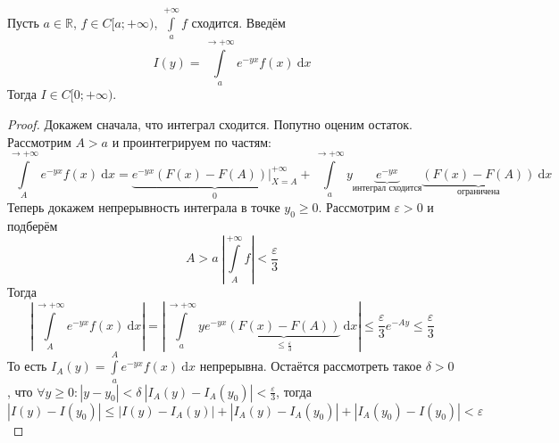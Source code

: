 \documentclass{article}
\let\eps\varepsilon
\begin{document}
    \begin{lemma}
        Пусть $a\in\mathbb R$, $f\in C[a;+\infty)$, $\int\limits_a^{+\infty}f$ сходится. Введём
        $$
        I(y)=\int\limits_a^{\to+\infty}e^{-yx}f(x)~\mathrm dx
        $$
        Тогда $I\in C[0;+\infty)$.
    \end{lemma}
    \begin{proof}
        Докажем сначала, что интеграл сходится. Попутно оценим остаток. Рассмотрим $A>a$ и проинтегрируем по частям:
        $$
        \int\limits_A^{\to+\infty}e^{-yx}f(x)~\mathrm dx=\underbrace{e^{-yx}(F(x)-F(A))\bigg|_{X=A}^{+\infty}}_0+\int\limits_a^{\to+\infty}y\underbrace{e^{-yx}}_{\text{интеграл сходится}}\underbrace{(F(x)-F(A))}_{\text{ограничена}}~\mathrm dx
        $$
        Теперь докажем непрерывность интеграла в точке $y_0\geqslant0$. Рассмотрим $\eps>0$ и подберём
        $$
        A>a~\left|\int\limits_A^{+\infty}f\right|<\frac\eps3
        $$
        Тогда
        $$
        \left|\int\limits_A^{\to+\infty}e^{-yx}f(x)~\mathrm dx\right|=\left|\int\limits_a^{\to+\infty}ye^{-yx}\underbrace{(F(x)-F(A))}_{\leqslant\frac\eps3}~\mathrm dx\right|\leqslant\frac\eps3e^{-Ay}\leqslant\frac\eps3
        $$
        То есть $I_A(y)=\int\limits_a^Ae^{-yx}f(x)~\mathrm dx$ непрерывна. Остаётся рассмотреть такое $\delta>0$, что $\forall y\geqslant0:|y-y_0|<\delta~|I_A(y)-I_A(y_0)|<\frac\eps3$, тогда
        $$
        |I(y)-I(y_0)|\leqslant|I(y)-I_A(y)|+|I_A(y)-I_A(y_0)|+|I_A(y_0)-I(y_0)|<\eps
        $$
    \end{proof}
\end{document}
